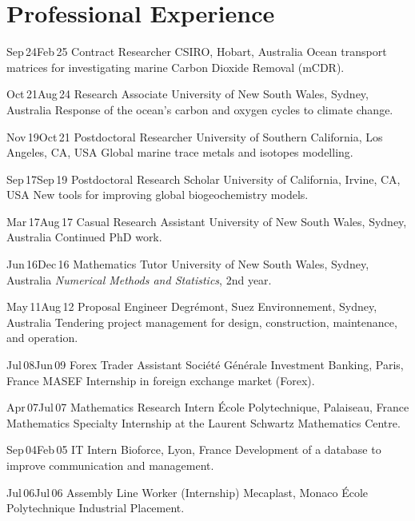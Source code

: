
\section{Professional Experience}
\begin{entrylist}
  \entry
    {Sep\,24\textemdash{}Feb\,25}
    {Contract Researcher}
    {CSIRO, Hobart, Australia}
    {Ocean transport matrices for investigating marine Carbon Dioxide Removal (mCDR).}


  \entry
    {Oct\,21\textemdash{}Aug\,24}
    {Research Associate}
    {University of New South Wales, Sydney, Australia}
    {Response of the ocean's carbon and oxygen cycles to climate change.}

  \entry
    {Nov\,19\textemdash{}Oct\,21}
    {Postdoctoral Researcher}
    {University of Southern California, Los Angeles, CA, USA}
    {Global marine trace metals and isotopes modelling.}

  \entry
    {Sep\,17\textemdash{}Sep\,19}
    {Postdoctoral Research Scholar}
    {University of California, Irvine, CA, USA}
    {New tools for improving global biogeochemistry models.}

  \entry
    {Mar\,17\textemdash{}Aug\,17}
    {Casual Research Assistant}
    {University of New South Wales, Sydney, Australia}
    {Continued PhD work.}

  \entry
    {Jun\,16\textemdash{}Dec\,16}
    {Mathematics Tutor}
    {University of New South Wales, Sydney, Australia}
    {\emph{Numerical Methods and Statistics}, 2nd year.}

  \entry
    {May\,11\textemdash{}Aug\,12}
    {Proposal Engineer}
    {Degr\'{e}mont, Suez Environnement, Sydney, Australia}
    {Tendering project management for design, construction, maintenance, and operation.}

  \entry
    {Jul\,08\textemdash{}Jun\,09}
    {Forex Trader Assistant}
    {Soci\'{e}t\'{e} G\'{e}n\'{e}rale Investment Banking, Paris, France}
    {MASEF Internship in foreign exchange market (Forex).}

  \entry
    {Apr\,07\textemdash{}Jul\,07}
    {Mathematics Research Intern}
    {\'{E}cole Polytechnique, Palaiseau, France}
    {Mathematics Specialty Internship at the Laurent Schwartz Mathematics Centre. }

  \entry
    {Sep\,04\textemdash{}Feb\,05}
    {IT Intern}
    {Bioforce, Lyon, France}
    {Development of a database to improve communication and management.}

  \entry
    {Jul\,06\textemdash{}Jul\,06}
    {Assembly Line Worker (Internship)}
    {Mecaplast, Monaco}
    {\'Ecole Polytechnique Industrial Placement.}

\end{entrylist}


